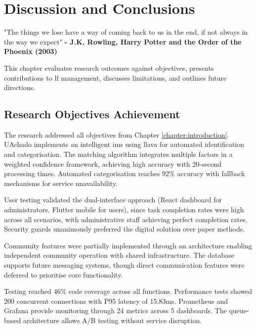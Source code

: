 \chapter{Discussion and Conclusions}
\label{chapter:discussion_conclusions}

\begin{introduction}
"The things we lose have a way of coming back to us in the end, if not always in the way we expect" \textbf{- J.K. Rowling, Harry Potter and the Order of the Phoenix (2003)}
\end{introduction}

This chapter evaluates research outcomes against objectives, presents contributions to \ac{lf} management, discusses limitations, and outlines future directions.


\section{Research Objectives Achievement} \label{section:objectives_achievement}

The research addressed all objectives from Chapter \ref{chapter:introduction}. UAchado implements an intelligent \ac{ims} using \ac{llava} for automated identification and categorisation. The matching algorithm integrates multiple factors in a weighted confidence framework, achieving high accuracy with 20-second processing times. Automated categorisation reaches 92\% accuracy with fallback mechanisms for service unavailability.

User testing validated the dual-interface approach (React dashboard for administrators, Flutter mobile for users), since task completion rates were high across all scenarios, with administrative staff achieving perfect completion rates. Security guards unanimously preferred the digital solution over paper methods.

Community features were partially implemented through an architecture enabling independent community operation with shared infrastructure. The database supports future messaging systems, though direct communication features were deferred to prioritise core functionality.

Testing reached 46\% code coverage across all functions. Performance tests showed 200 concurrent connections with P95 latency of 15.83ms. Prometheus and Grafana provide monitoring through 24 metrics across 5 dashboards. The queue-based architecture allows A/B testing without service disruption.


